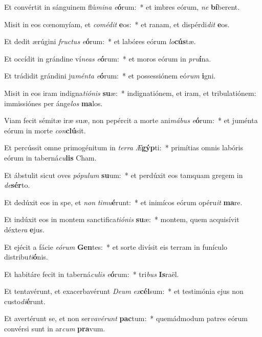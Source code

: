 \item Et convértit in sánguinem flú\textit{mi}\textit{na} \textit{e}\textbf{ó}rum:~* et imbres eórum, \textit{ne} \textbf{bí}berent.
\item Misit in eos cœnomyíam, et \textit{com}\textit{é}\textit{dit} \textbf{e}os:~* et ranam, et dispérdi\textit{dit} \textbf{e}os.
\item Et dedit ærúgini \textit{fruc}\textit{tus} \textit{e}\textbf{ó}rum:~* et labóres eórum \textit{lo}\textbf{cús}tæ.
\item Et occídit in grándine ví\textit{ne}\textit{as} \textit{e}\textbf{ó}rum:~* et moros eórum in \textit{pru}\textbf{í}na.
\item Et trádidit grándini ju\textit{mén}\textit{ta} \textit{e}\textbf{ó}rum:~* et possessiónem eó\textit{rum} \textbf{i}gni.
\item Misit in eos iram indigna\textit{ti}\textit{ó}\textit{nis} \textbf{su}æ:~* indignatiónem, et iram, et tribulatiónem: immissiónes per ánge\textit{los} \textbf{ma}los.
\item Viam fecit sémitæ iræ suæ, non pepércit a morte ani\textit{má}\textit{bus} \textit{e}\textbf{ó}rum:~* et juménta eórum in morte \textit{con}\textbf{clú}sit.
\item Et percússit omne primogénitum in \textit{ter}\textit{ra} \textit{Æ}\textbf{gýp}ti:~* primítias omnis labóris eórum in taberná\textit{cu}\textbf{lis} Cham.
\item Et ábstulit sicut oves \textit{pó}\textit{pu}\textit{lum} \textbf{su}um:~* et perdúxit eos tamquam gregem in \textit{de}\textbf{sér}to.
\item Et dedúxit eos in spe, et \textit{non} \textit{ti}\textit{mu}\textbf{é}runt:~* et inimícos eórum opéru\textit{it} \textbf{ma}re.
\item Et indúxit eos in montem sanctifica\textit{ti}\textit{ó}\textit{nis} \textbf{su}æ:~* montem, quem acquisívit déxte\textit{ra} \textbf{e}jus.
\item Et ejécit a fácie \textit{e}\textit{ó}\textit{rum} \textbf{Gen}tes:~* et sorte divísit eis terram in funículo distribu\textit{ti}\textbf{ó}nis.
\item Et habitáre fecit in taberná\textit{cu}\textit{lis} \textit{e}\textbf{ó}rum:~* tri\textit{bus} \textbf{Is}raël.
\item Et tentavérunt, et exacerbavérunt \textit{De}\textit{um} \textit{ex}\textbf{cél}sum:~* et testimónia ejus non custo\textit{di}\textbf{é}runt.
\item Et avertérunt se, et non ser\textit{va}\textit{vé}\textit{runt} \textbf{pac}tum:~* quemádmodum patres eórum convérsi sunt in ar\textit{cum} \textbf{pra}vum.
